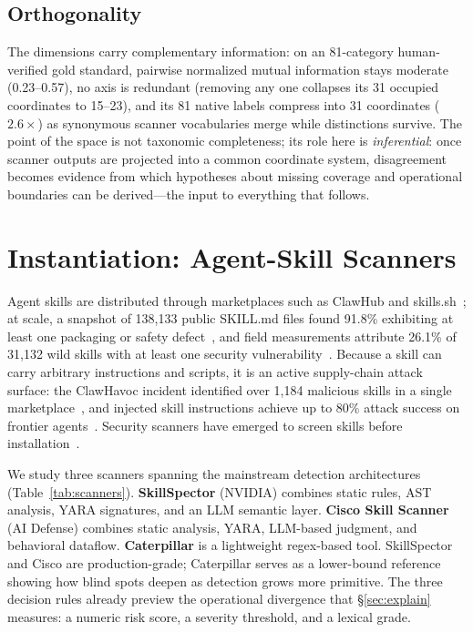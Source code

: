 \documentclass[sigconf,nonacm]{acmart}
\begin{document}
\subsection{Orthogonality}
The dimensions carry complementary information: on an 81-category human-verified gold standard, pairwise normalized mutual information stays moderate (0.23--0.57), no axis is redundant (removing any one collapses its 31 occupied coordinates to 15--23), and its 81 native labels compress into 31 coordinates ($2.6\times$) as synonymous scanner vocabularies merge while distinctions survive. The point of the space is not taxonomic completeness; its role here is \emph{inferential}: once scanner outputs are projected into a common coordinate system, disagreement becomes evidence from which hypotheses about missing coverage and operational boundaries can be derived---the input to everything that follows.

\section{Instantiation: Agent-Skill Scanners}
\label{sec:background}

Agent skills are distributed through marketplaces such as ClawHub and skills.sh~\cite{clawhub2026}; at scale, a snapshot of 138{,}133 public SKILL.md files found 91.8\% exhibiting at least one packaging or safety defect~\cite{reusability2026}, and field measurements attribute 26.1\% of 31{,}132 wild skills with at least one security vulnerability~\cite{skillscan2026}. Because a skill can carry arbitrary instructions and scripts, it is an active supply-chain attack surface: the ClawHavoc incident identified over 1{,}184 malicious skills in a single marketplace~\cite{clawhub2026}, and injected skill instructions achieve up to 80\% attack success on frontier agents~\cite{skillinject2026}. Security scanners have emerged to screen skills before installation~\cite{locatejudge2026}.

We study three scanners spanning the mainstream detection architectures (Table~\ref{tab:scanners}). \textbf{SkillSpector} (NVIDIA) combines static rules, AST analysis, YARA signatures, and an LLM semantic layer. \textbf{Cisco Skill Scanner} (AI Defense) combines static analysis, YARA, LLM-based judgment, and behavioral dataflow. \textbf{Caterpillar} is a lightweight regex-based tool. SkillSpector and Cisco are production-grade; Caterpillar serves as a lower-bound reference showing how blind spots deepen as detection grows more primitive. The three decision rules already preview the operational divergence that \S\ref{sec:explain} measures: a numeric risk score, a severity threshold, and a lexical grade.
\end{document}
